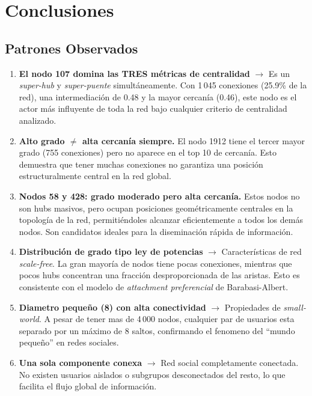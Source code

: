 \documentclass[12pt,a4paper,oneside,openany]{book}
\begin{document}
\chapter{Conclusiones}

\section{Patrones Observados}

\begin{recomendacionbox}
\begin{enumerate}[leftmargin=0.8cm]
  \item \textbf{El nodo 107 domina las TRES métricas de centralidad}
    $\rightarrow$ Es un \textit{super-hub} y \textit{super-puente} simultáneamente.
    Con 1\,045 conexiones (25.9\% de la red), una intermediación de 0.48 y la mayor
    cercanía (0.46), este nodo es el actor más influyente de toda la red bajo
    cualquier criterio de centralidad analizado.
  
  \item \textbf{Alto grado $\neq$ alta cercanía siempre.}
    El nodo 1912 tiene el tercer mayor grado (755 conexiones) pero no aparece en el
    top 10 de cercanía. Esto demuestra que tener muchas conexiones no garantiza una
    posición estructuralmente central en la red global.

  \item \textbf{Nodos 58 y 428: grado moderado pero alta cercanía.}
    Estos nodos no son hubs masivos, pero ocupan posiciones geométricamente centrales
    en la topología de la red, permitiéndoles alcanzar eficientemente a todos los demás
    nodos. Son candidatos ideales para la diseminación rápida de información.

  \item \textbf{Distribución de grado tipo ley de potencias}
    $\rightarrow$ Características de red \textit{scale-free}. La gran mayoría de nodos
    tiene pocas conexiones, mientras que pocos hubs concentran una fracción
    desproporcionada de las aristas. Esto es consistente con el modelo de
    \textit{attachment preferencial} de Barabasi-Albert.

  \item \textbf{Diametro peque\~no (8) con alta conectividad}
    $\rightarrow$ Propiedades de \textit{small-world}. A pesar de tener mas de 4\,000
    nodos, cualquier par de usuarios esta separado por un máximo de 8 saltos,
    confirmando el fenomeno del ``mundo peque\~no'' en redes sociales.

  \item \textbf{Una sola componente conexa}
    $\rightarrow$ Red social completamente conectada. No existen usuarios aislados
    o subgrupos desconectados del resto, lo que facilita el flujo global de información.
\end{enumerate}
\end{recomendacionbox}
\end{document}
